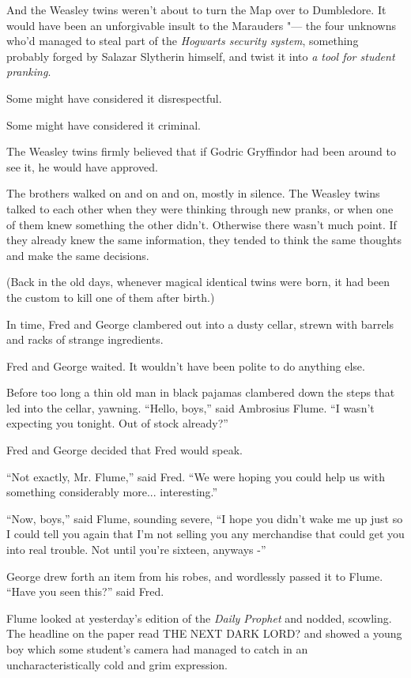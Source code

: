 And the Weasley twins weren't about to turn the Map over to Dumbledore.
It would have been an unforgivable insult to the Marauders "--- the four
unknowns who'd managed to steal part of the \emph{Hogwarts security
system}, something probably forged by Salazar Slytherin himself, and
twist it into \emph{a tool for student pranking}.

Some might have considered it disrespectful.

Some might have considered it criminal.

The Weasley twins firmly believed that if Godric Gryffindor had been
around to see it, he would have approved.

The brothers walked on and on and on, mostly in silence. The Weasley
twins talked to each other when they were thinking through new pranks,
or when one of them knew something the other didn't. Otherwise there
wasn't much point. If they already knew the same information, they
tended to think the same thoughts and make the same decisions.

(Back in the old days, whenever magical identical twins were born, it
had been the custom to kill one of them after birth.)

In time, Fred and George clambered out into a dusty cellar, strewn with
barrels and racks of strange ingredients.

Fred and George waited. It wouldn't have been polite to do anything
else.

Before too long a thin old man in black pajamas clambered down the steps
that led into the cellar, yawning. ``Hello, boys,'' said Ambrosius
Flume. ``I wasn't expecting you tonight. Out of stock already?''

Fred and George decided that Fred would speak.

``Not exactly, Mr. Flume,'' said Fred. ``We were hoping you could help
us with something considerably more... interesting.''

``Now, boys,'' said Flume, sounding severe, ``I hope you didn't wake me
up just so I could tell you again that I'm not selling you any
merchandise that could get you into real trouble. Not until you're
sixteen, anyways -''

George drew forth an item from his robes, and wordlessly passed it to
Flume. ``Have you seen this?'' said Fred.

Flume looked at yesterday's edition of the \emph{Daily Prophet} and
nodded, scowling. The headline on the paper read THE NEXT DARK LORD? and
showed a young boy which some student's camera had managed to catch in
an uncharacteristically cold and grim expression.

